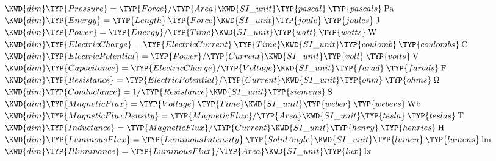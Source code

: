 \begin{Fortress}
\( \KWD{dim} \TYP{Pressure} = \TYP{Force} / \TYP{Area}  \KWD{SI{\char'137}unit} \TYP{pascal}\mskip 4mu plus 4mu\TYP{pascals}\mskip 4mu plus 4mu\mathrm{Pa} \)\\
\( \KWD{dim} \TYP{Energy} = \TYP{Length}\mskip 4mu plus 4mu\TYP{Force}  \KWD{SI{\char'137}unit} \TYP{joule}\mskip 4mu plus 4mu\TYP{joules}\mskip 4mu plus 4mu\mathrm{J} \)\\
\( \KWD{dim} \TYP{Power} = \TYP{Energy} / \TYP{Time}  \KWD{SI{\char'137}unit} \TYP{watt}\mskip 4mu plus 4mu\TYP{watts}\mskip 4mu plus 4mu\mathrm{W} \)\\
\( \KWD{dim} \TYP{ElectricCharge} = \TYP{ElectricCurrent}\mskip 4mu plus 4mu\TYP{Time}  \KWD{SI{\char'137}unit} \TYP{coulomb}\mskip 4mu plus 4mu\TYP{coulombs}\mskip 4mu plus 4mu\mathrm{C} \)\\
\( \KWD{dim} \TYP{ElectricPotential} = \TYP{Power} / \TYP{Current}  \KWD{SI{\char'137}unit} \TYP{volt}\mskip 4mu plus 4mu\TYP{volts}\mskip 4mu plus 4mu\mathrm{V} \)\\
\( \KWD{dim} \TYP{Capacitance} = \TYP{ElectricCharge} / \TYP{Voltage}  \KWD{SI{\char'137}unit} \TYP{farad}\mskip 4mu plus 4mu\TYP{farads}\mskip 4mu plus 4mu\mathrm{F} \)\\
\( \KWD{dim} \TYP{Resistance} = \TYP{ElectricPotential} / \TYP{Current}  \KWD{SI{\char'137}unit} \TYP{ohm}\mskip 4mu plus 4mu\TYP{ohms}\mskip 4mu plus 4mu\Omega \)\\
\( \KWD{dim} \TYP{Conductance} = 1 / \TYP{Resistance}  \KWD{SI{\char'137}unit} \TYP{siemens}\mskip 4mu plus 4mu\mathrm{S} \)\\
\( \KWD{dim} \TYP{MagneticFlux} = \TYP{Voltage}\mskip 4mu plus 4mu\TYP{Time}  \KWD{SI{\char'137}unit} \TYP{weber}\mskip 4mu plus 4mu\TYP{webers}\mskip 4mu plus 4mu\mathrm{Wb} \)\\
\( \KWD{dim} \TYP{MagneticFluxDensity} = \TYP{MagneticFlux} / \TYP{Area}  \KWD{SI{\char'137}unit} \TYP{tesla}\mskip 4mu plus 4mu\TYP{teslas}\mskip 4mu plus 4mu\mathrm{T} \)\\
\( \KWD{dim} \TYP{Inductance} = \TYP{MagneticFlux} / \TYP{Current}  \KWD{SI{\char'137}unit} \TYP{henry}\mskip 4mu plus 4mu\TYP{henries}\mskip 4mu plus 4mu\mathrm{H} \)\\
\( \KWD{dim} \TYP{LuminousFlux} = \TYP{LuminousIntensity}\mskip 4mu plus 4mu\TYP{SolidAngle}  \KWD{SI{\char'137}unit} \TYP{lumen}\mskip 4mu plus 4mu\TYP{lumens}\mskip 4mu plus 4mu\mathrm{lm} \)\\
\( \KWD{dim} \TYP{Illuminance} = \TYP{LuminousFlux} / \TYP{Area}  \KWD{SI{\char'137}unit} \TYP{lux}\mskip 4mu plus 4mu\mathrm{lx} \)\\

\end{Fortress}
